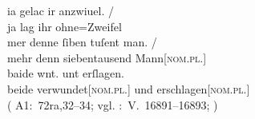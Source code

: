 \begin{exe}
\ex \label{ex:konjadjvvbeide}
	
		\gll ia gelac ir anzwiuel. {/} \\
			ja lag ihr ohne=Zweifel \\
		\gll mer denne {ſiben tuſent} man. {/} \\
			mehr denn siebentausend Mann[\textsc{nom.pl.\MascM}] \\
		\gll baide wnt. unt erſlagen. \\
			beide verwundet[\textsc{nom.pl.\MascM}] und erschlagen[\textsc{nom.pl.\MascM}] \\
		\trans {}
			(%
				A1:~72ra,32--34; vgl.
				\KC:~V.~16891--16893;
				\cite[386]{schroeder1895}%
			)
	


\end{exe}
